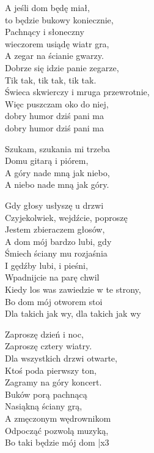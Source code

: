 
\begin{textn}
    A jeśli dom będę miał,\\
    to będzie bukowy koniecznie,\\
    Pachnący i słoneczny\\
    wieczorem usiądę wiatr gra,\\
    A zegar na ścianie gwarzy.\\
    Dobrze się idzie panie zegarze,\\
    Tik tak, tik tak, tik tak.\\
    Świeca skwierczy i mruga przewrotnie,\\
    Więc puszczam oko do niej,\\
    dobry humor dziś pani ma\\
    dobry humor dziś pani ma

    \vin Szukam, szukania mi trzeba\\
    \vin Domu gitarą i piórem,\\
    \vin A góry nade mną jak niebo,\\
    \vin A niebo nade mną jak góry.

    Gdy głosy usłyszę u drzwi\\
    Czyjekolwiek, wejdźcie, poproszę\\
    Jestem zbieraczem głosów,\\
    A dom mój bardzo lubi, gdy\\
    Śmiech ściany mu rozjaśnia\\
    I gędźby lubi, i pieśni,\\
    Wpadnijcie na parę chwil\\
    Kiedy los was zawiedzie w te strony,\\
    Bo dom mój otworem stoi\\
    Dla takich jak wy, dla takich jak wy

    Zaproszę dzień i noc,\\
    Zaproszę cztery wiatry.\\
    Dla wszystkich drzwi otwarte,\\
    Ktoś poda pierwszy ton,\\
    Zagramy na góry koncert.\\
    Buków porą pachnącą\\
    Nasiąkną ściany grą,\\
    A zmęczonym wędrownikom\\
    Odpocząć pozwolą muzyką,\\
    Bo taki będzie mój dom |x3
\end{textn}
